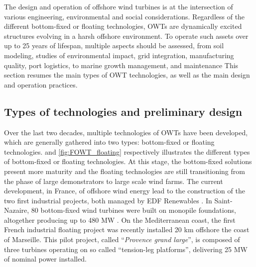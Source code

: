 The design and operation of offshore wind turbines is at the intersection of various engineering, environmental and social considerations. 
Regardless of the different bottom-fixed or floating technologies, OWTs are dynamically excited structures evolving in a harsh offshore environment.   
To operate such assets over up to 25 years of lifespan, multiple aspects should be assessed, from soil modeling, studies of environmental impact, grid integration, manufacturing quality, port logistics, to marine growth management, and maintenance
This section resumes the main types of OWT technologies, as well as the main design and operation practices.   

\subsection{Types of technologies and preliminary design}
Over the last two decades, multiple technologies of OWTs have been developed, which are generally gathered into two types: bottom-fixed or floating technologies. 
 and \ref{fig:FOWT_floating} respectively illustrates the different types of bottom-fixed or floating technologies. 
At this stage, the bottom-fixed solutions present more maturity and the floating technologies are still transitioning from the phase of large demonstrators to large scale wind farms. 
The current development, in France, of offshore wind energy lead to the construction of the two first industrial projects, both managed by EDF Renewables . 
In Saint-Nazaire, 80 bottom-fixed wind turbines were built on monopile foundations, altogether producing up to 480 MW . 
On the Mediterranean coast, the first French industrial floating project was recently installed 20 km offshore the coast of Marseille. 
This pilot project, called ``\textit{Provence grand large}'', is composed of three turbines operating on so called ``tension-leg platforms'', delivering 25 MW of nominal power installed.     

